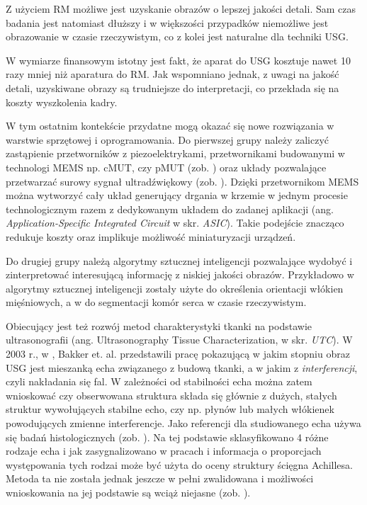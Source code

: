 Z użyciem RM możliwe jest uzyskanie obrazów o lepszej jakości detali. Sam czas badania jest natomiast dłuższy i w większości przypadków niemożliwe jest obrazowanie w czasie rzeczywistym, co z kolei jest naturalne dla techniki USG.

W wymiarze finansowym istotny jest fakt, że aparat do USG kosztuje nawet 10 razy mniej niż aparatura do RM. Jak wspomniano jednak, z uwagi na jakość detali, uzyskiwane obrazy są trudniejsze do interpretacji, co przekłada się na koszty wyszkolenia kadry. 

W tym ostatnim kontekście przydatne mogą okazać się nowe rozwiązania w warstwie sprzętowej i oprogramowania. Do pierwszej grupy należy zaliczyć zastąpienie przetworników z piezoelektrykami, przetwornikami budowanymi w technologi MEMS np. cMUT, czy pMUT (zob. \cite{Butterfly2018}) oraz układy pozwalające przetwarzać surowy sygnał ultradźwiękowy (zob. \cite{US4US}). Dzięki przetwornikom MEMS można wytworzyć cały układ generujący drgania w krzemie w jednym procesie technologicznym razem z dedykowanym układem do zadanej aplikacji (ang. \textit{Application-Specific Integrated Circuit} w skr. \textit{ASIC}). Takie podejście znacząco redukuje koszty oraz implikuje możliwość miniaturyzacji urządzeń.

Do drugiej grupy należą algorytmy sztucznej inteligencji pozwalające wydobyć i zinterpretować interesującą informację z niskiej jakości obrazów. Przykładowo w \cite{Cunningham2017} algorytmy sztucznej inteligencji zostały użyte do określenia orientacji włókien mięśniowych, a w \cite{NVIDIA-CLARA} do segmentacji komór serca w czasie rzeczywistym. 

Obiecujący jest też rozwój metod charakterystyki tkanki na podstawie ultrasonografii (ang. Ultrasonography Tissue Characterization, w skr. \textit{UTC}). W 2003 r., w \cite{Bakker2003}, Bakker et. al. przedstawili pracę pokazującą w jakim stopniu obraz USG jest mieszanką echa związanego z budową tkanki, a w jakim z \textit{interferencji}, czyli nakładania się fal. W zależności od stabilności echa można zatem wnioskować czy obserwowana struktura składa się głównie z dużych, stałych struktur wywołujących stabilne echo, czy np. płynów lub małych włókienek powodujących zmienne interferencje. Jako referencji dla studiowanego echa używa się badań histologicznych (zob. \cite{Bakker2000}). Na tej podstawie sklasyfikowano 4 różne rodzaje echa i jak zasygnalizowano w pracach \cite{vanSchie2009} i \cite{Heyward2018} informacja o proporcjach występowania tych rodzai może być użyta do oceny struktury ścięgna Achillesa. Metoda ta nie została jednak jeszcze w pełni zwalidowana i możliwości wnioskowania na jej podstawie są wciąż niejasne (zob. \cite{Heyward2018}).

